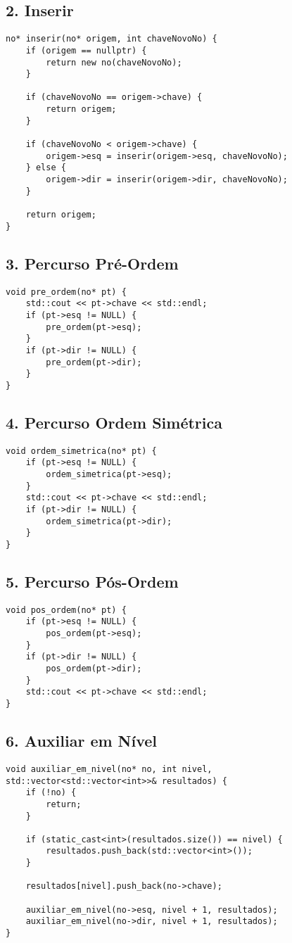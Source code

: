 \documentclass[a4paper,12pt]{article}
\begin{document}
\subsection*{2. Inserir}
\begin{verbatim}
no* inserir(no* origem, int chaveNovoNo) {
    if (origem == nullptr) {
        return new no(chaveNovoNo);
    }

    if (chaveNovoNo == origem->chave) {
        return origem;
    }

    if (chaveNovoNo < origem->chave) {
        origem->esq = inserir(origem->esq, chaveNovoNo);
    } else {
        origem->dir = inserir(origem->dir, chaveNovoNo);
    }

    return origem;
}
\end{verbatim}

\subsection*{3. Percurso Pré-Ordem}
\begin{verbatim}
void pre_ordem(no* pt) {
    std::cout << pt->chave << std::endl;
    if (pt->esq != NULL) {
        pre_ordem(pt->esq);
    }
    if (pt->dir != NULL) {
        pre_ordem(pt->dir);
    }
}
\end{verbatim}

\subsection*{4. Percurso Ordem Simétrica}
\begin{verbatim}
void ordem_simetrica(no* pt) {
    if (pt->esq != NULL) {
        ordem_simetrica(pt->esq);
    }
    std::cout << pt->chave << std::endl;
    if (pt->dir != NULL) {
        ordem_simetrica(pt->dir);
    }
}
\end{verbatim}

\subsection*{5. Percurso Pós-Ordem}
\begin{verbatim}
void pos_ordem(no* pt) {
    if (pt->esq != NULL) {
        pos_ordem(pt->esq);
    }
    if (pt->dir != NULL) {
        pos_ordem(pt->dir);
    }
    std::cout << pt->chave << std::endl;
}
\end{verbatim}

\subsection*{6. Auxiliar em Nível}
\begin{verbatim}
void auxiliar_em_nivel(no* no, int nivel, std::vector<std::vector<int>>& resultados) {
    if (!no) {
        return;
    }

    if (static_cast<int>(resultados.size()) == nivel) {
        resultados.push_back(std::vector<int>());
    }

    resultados[nivel].push_back(no->chave);

    auxiliar_em_nivel(no->esq, nivel + 1, resultados);
    auxiliar_em_nivel(no->dir, nivel + 1, resultados);
}
\end{verbatim}
\end{document}
